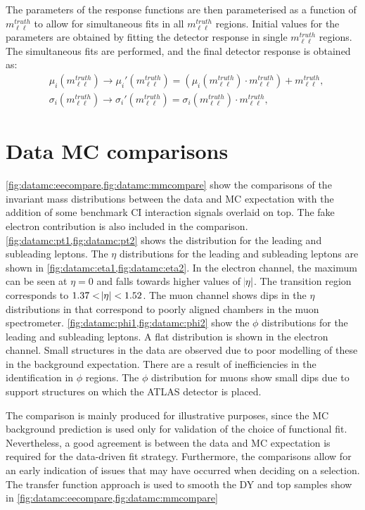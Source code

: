 The parameters of the response functions are then parameterised as a function of $m_{\ell\ell}^{truth}$ to allow for simultaneous fits in all $m_{\ell\ell}^{truth}$ regions. Initial values for the parameters are obtained by fitting the detector response in single $m_{\ell\ell}^{truth}$ regions. The simultaneous fits are performed, and the final detector response is obtained as:
\begin{equation}\label{eq:TF_responseTransformation}
    \begin{aligned}
        & \mu_i(m_{\ell\ell}^{truth}) \to \mu_i'(m_{\ell\ell}^{truth}) = \left(\mu_i(m_{\ell\ell}^{truth}) \cdot m_{\ell\ell}^{truth}\right) + m_{\ell\ell}^{truth}, \\
        & \sigma_i(m_{\ell\ell}^{truth}) \to \sigma_i'(m_{\ell\ell}^{truth}) = \sigma_i(m_{\ell\ell}^{truth}) \cdot m_{\ell\ell}^{truth},
    \end{aligned}
\end{equation}

\section{Data MC comparisons}\label{sec:datamc:compare}
\cref{fig:datamc:eecompare,fig:datamc:mmcompare} show the comparisons of the invariant mass distributions between the data and MC expectation with the addition of some benchmark CI interaction signals overlaid on top. The fake electron contribution is also included in the comparison. \cref{fig:datamc:pt1,fig:datamc:pt2} shows the \pt distribution for the leading and subleading leptons. The $\eta$ distributions for the leading and subleading leptons are shown in \cref{fig:datamc:eta1,fig:datamc:eta2}. In the electron channel, the maximum can be seen at $\eta = 0$ and falls towards higher values of $\abs{\eta}$. The transition region corresponds to $1.37 < \abs{\eta} < 1.52$. The muon channel shows dips in the $\eta$ distributions in that correspond to poorly aligned chambers in the muon spectrometer. \cref{fig:datamc:phi1,fig:datamc:phi2} show the $\phi$ distributions for the leading and subleading leptons. A flat distribution is shown in the electron channel. Small structures in the data are observed due to poor modelling of these in the background expectation. There are a result of inefficiencies in the identification in $\phi$ regions. The $\phi$ distribution for muons show small dips due to support structures on which the ATLAS detector is placed. 

The comparison is mainly produced for illustrative purposes, since the MC background prediction is used only for validation of the choice of functional fit. Nevertheless, a good agreement is between the data and MC expectation is required for the data-driven fit strategy. Furthermore, the comparisons allow for an early indication of issues that may have occurred when deciding on a selection. The transfer function approach is used to smooth the DY and top samples show in \cref{fig:datamc:eecompare,fig:datamc:mmcompare}


